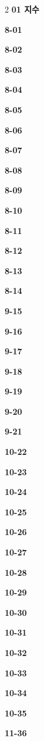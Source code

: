 \documentclass[10pt,a4paper]{article}
\begin{document}
\begin{multicols}{2}\small
\noindent\textbf{01 지수}\par\smallskip
\noindent\textbf{8-01}\ \par
\noindent\textbf{8-02}\ \par
\noindent\textbf{8-03}\ \par
\noindent\textbf{8-04}\ \par
\noindent\textbf{8-05}\ \par
\noindent\textbf{8-06}\ \par
\noindent\textbf{8-07}\ \par
\noindent\textbf{8-08}\ \par
\noindent\textbf{8-09}\ \par
\noindent\textbf{8-10}\ \par
\noindent\textbf{8-11}\ \par
\noindent\textbf{8-12}\ \par
\noindent\textbf{8-13}\ \par
\noindent\textbf{8-14}\ \par
\noindent\textbf{9-15}\ \par
\noindent\textbf{9-16}\ \par
\noindent\textbf{9-17}\ \par
\noindent\textbf{9-18}\ \par
\noindent\textbf{9-19}\ \par
\noindent\textbf{9-20}\ \par
\noindent\textbf{9-21}\ \par
\noindent\textbf{10-22}\ \par
\noindent\textbf{10-23}\ \par
\noindent\textbf{10-24}\ \par
\noindent\textbf{10-25}\ \par
\noindent\textbf{10-26}\ \par
\noindent\textbf{10-27}\ \par
\noindent\textbf{10-28}\ \par
\noindent\textbf{10-29}\ \par
\noindent\textbf{10-30}\ \par
\noindent\textbf{10-31}\ \par
\noindent\textbf{10-32}\ \par
\noindent\textbf{10-33}\ \par
\noindent\textbf{10-34}\ \par
\noindent\textbf{10-35}\ \par
\noindent\textbf{11-36}\ \par

\end{multicols}
\end{document}
